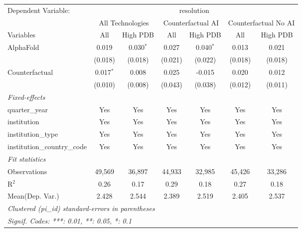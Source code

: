 \begingroup
\centering
\begin{tabular}{lcccccc}
   \tabularnewline \midrule \midrule
   Dependent Variable: & \multicolumn{6}{c}{resolution}\\
 & \multicolumn{2}{c}{All Technologies} & \multicolumn{2}{c}{Counterfactual AI} & \multicolumn{2}{c}{Counterfactual No AI} \\
\cmidrule(lr){1-1}\cmidrule(lr){2-3} \cmidrule(lr){4-5} \cmidrule(lr){6-7}
Variables & \multicolumn{1}{c}{All} & \multicolumn{1}{c}{High PDB} & \multicolumn{1}{c}{All} & \multicolumn{1}{c}{High PDB} & \multicolumn{1}{c}{All} & \multicolumn{1}{c}{High PDB} \\
\cmidrule(lr){1-1}\cmidrule(lr){2-2} \cmidrule(lr){3-3} \cmidrule(lr){4-4} \cmidrule(lr){5-5} \cmidrule(lr){6-6} \cmidrule(lr){7-7}
   AlphaFold                    & 0.019       & 0.030$^{*}$ & 0.027   & 0.040$^{*}$ & 0.013   & 0.021\\   
                                & (0.018)     & (0.018)     & (0.021) & (0.022)     & (0.018) & (0.018)\\   
   Counterfactual               & 0.017$^{*}$ & 0.008       & 0.025   & -0.015      & 0.020   & 0.012\\   
                                & (0.010)     & (0.008)     & (0.043) & (0.038)     & (0.012) & (0.011)\\   
   \midrule
   \emph{Fixed-effects}\\
   quarter\_year                & Yes         & Yes         & Yes     & Yes         & Yes     & Yes\\  
   institution                  & Yes         & Yes         & Yes     & Yes         & Yes     & Yes\\  
   institution\_type            & Yes         & Yes         & Yes     & Yes         & Yes     & Yes\\  
   institution\_country\_code   & Yes         & Yes         & Yes     & Yes         & Yes     & Yes\\  
   \midrule
   \emph{Fit statistics}\\
   Observations                 & 49,569      & 36,897      & 44,933  & 32,985      & 45,426  & 33,286\\  
   R$^2$                        & 0.26        & 0.17        & 0.29    & 0.18        & 0.27    & 0.18\\  
Mean(Dep. Var.) & 2.428 & 2.544 & 2.389 & 2.519 & 2.405 & 2.537 \\
   \midrule \midrule
   \multicolumn{7}{l}{\emph{Clustered (pi\_id) standard-errors in parentheses}}\\
   \multicolumn{7}{l}{\emph{Signif. Codes: ***: 0.01, **: 0.05, *: 0.1}}\\
\end{tabular}
\par\endgroup
